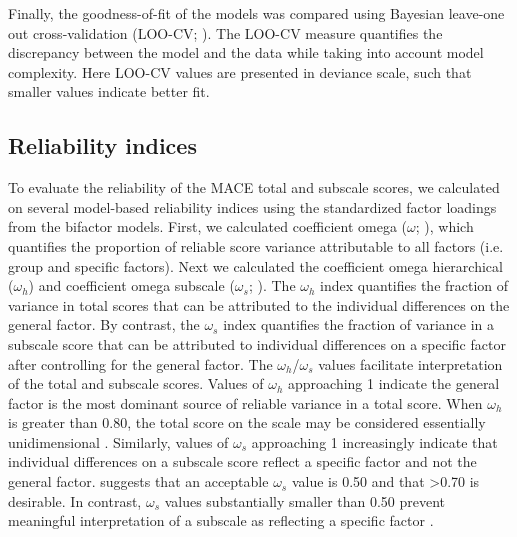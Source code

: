 \documentclass[letterpaper,man,natbib]{apa6}  %
\begin{document}
Finally, the goodness-of-fit of the models was compared using Bayesian leave-one out cross-validation (LOO-CV; \citealt{vehtari2017practical}). The LOO-CV measure quantifies the discrepancy between the model and the data while taking into account model complexity. Here LOO-CV values are presented in deviance scale, such that smaller values indicate better fit.

\subsection{Reliability indices}

To evaluate the reliability of the MACE total and subscale scores, we calculated on several model-based reliability indices using the standardized factor loadings from the bifactor models. First, we calculated coefficient omega ($\omega$; \citealt{mcdonald1999test}), which quantifies the proportion of reliable score variance attributable to all factors (i.e. group and specific factors). Next we calculated the coefficient omega hierarchical ($\omega_h$) and coefficient omega subscale ($\omega_s$; \citealt{reise2013applying, rodriguez2016evaluating}). The $\omega_h$ index quantifies the fraction of variance in total scores that can be attributed to the individual differences on the general factor. By contrast, the $\omega_s$ index quantifies the fraction of variance in a subscale score that can be attributed to individual differences on a specific factor after controlling for the general factor. The $\omega_h$/$\omega_s$ values facilitate interpretation of the total and subscale scores. Values of $\omega_h$ approaching 1 indicate the general factor is the most dominant source of reliable variance in a total score. When $\omega_h$ is greater than 0.80, the total score on the scale may be considered essentially unidimensional \citep{rodriguez2016applying}. Similarly, values of $\omega_s$ approaching 1 increasingly indicate that individual differences on a subscale score reflect a specific factor and not the general factor. \cite{canivez2016bifactor} suggests that an acceptable $\omega_s$ value is 0.50 and that >0.70 is desirable. In contrast, $\omega_s$ values substantially smaller than 0.50 prevent meaningful interpretation of a subscale as reflecting a specific factor \citep{gignac2013bifactor}. 
\end{document}
